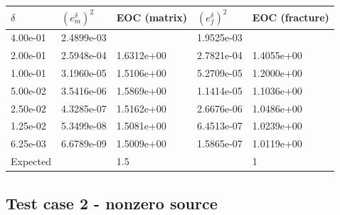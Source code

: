 \documentclass[a4paper]{article}
\def\tn#1{{\mathbb{#1}}}    %
\begin{document}
\begin{tabular}{|l|ll|ll|}
\hline
$\delta$ & $(e_m^\delta)^2$ & EOC (matrix) & $(e_f^\delta)^2$ & EOC (fracture)\\
\hline
4.00e-01 & 2.4899e-03 &            & 1.9525e-03 & \\
2.00e-01 & 2.5948e-04 & 1.6312e+00 & 2.7821e-04 & 1.4055e+00\\
1.00e-01 & 3.1960e-05 & 1.5106e+00 & 5.2709e-05 & 1.2000e+00\\
5.00e-02 & 3.5416e-06 & 1.5869e+00 & 1.1414e-05 & 1.1036e+00\\
2.50e-02 & 4.3285e-07 & 1.5162e+00 & 2.6676e-06 & 1.0486e+00\\
1.25e-02 & 5.3499e-08 & 1.5081e+00 & 6.4513e-07 & 1.0239e+00\\
6.25e-03 & 6.6789e-09 & 1.5009e+00 & 1.5865e-07 & 1.0119e+00\\
\hline
Expected & & 1.5 & & 1\\
\hline
\end{tabular}

% 



\subsection{Test case 2 - nonzero source}
\end{document}
